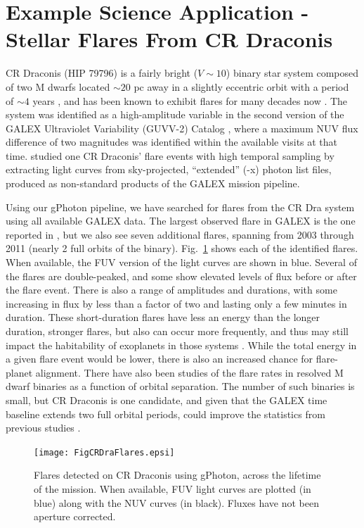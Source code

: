 \documentclass[5p]{elsarticle}
\begin{document}
\section{Example Science Application - Stellar Flares From CR Draconis}
\label{scienceexamples}
CR Draconis (HIP 79796) is a fairly bright ($V \sim 10$) binary star system composed of two M dwarfs located $\sim 20$ pc away in a slightly eccentric orbit with a period of $\sim 4$ years \citep{tam2008}, and has been known to exhibit flares for many decades now \citep{cri1970}.  The system was identified as a high-amplitude variable in the second version of the GALEX Ultraviolet Variability (GUVV-2) Catalog \citep{whe2008}, where a maximum NUV flux difference of two magnitudes was identified within the available visits at that time.  \citet{wel2006} studied one CR Draconis' flare events with high temporal sampling by extracting light curves from sky-projected, ``extended'' (-x) photon list files, produced as non-standard products of the GALEX mission pipeline.

Using our gPhoton pipeline, we have searched for flares from the CR Dra system using all available GALEX data.  The largest observed flare in GALEX is the one reported in \citet{wel2006}, but we also see seven additional flares, spanning from 2003 through 2011 (nearly 2 full orbits of the binary).  Fig.\ \ref{crdraflares} shows each of the identified flares.  When available, the FUV version of the light curves are shown in blue.  Several of the flares are double-peaked, and some show elevated levels of flux before or after the flare event.  There is also a range of amplitudes and durations, with some increasing in flux by less than a factor of two and lasting only a few minutes in duration.  These short-duration flares have less an energy than the longer duration, stronger flares, but also can occur more frequently, and thus may still impact the habitability of exoplanets in those systems \citep[e.g.,][]{ram2013}.  While the total energy in a given flare event would be lower, there is also an increased chance for flare-planet alignment.  There have also been studies of the flare rates in resolved M dwarf binaries as a function of orbital separation.  The number of such binaries is small, but CR Draconis is one candidate, and given that the GALEX time baseline extends two full orbital periods, could improve the statistics from previous studies \citep{tam2008}.

\begin{figure}
\texttt{[image: FigCRDraFlares.epsi]}
\caption{Flares detected on CR Draconis using gPhoton, across the lifetime of the mission.  When available, FUV light curves are plotted (in blue) along with the NUV curves (in black).  Fluxes have not been aperture corrected. \label{crdraflares}}
\end{figure}
\end{document}
